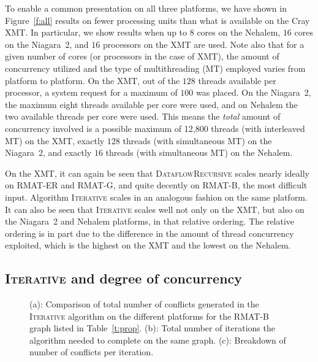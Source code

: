 \documentclass{article}
\begin{document}
To enable a common presentation on all three platforms,  we have shown 
in Figure~\ref{f:all} results on fewer processing units than what is available
on the Cray XMT. In particular, we show results when up to $8$ cores on the Nehalem, 
$16$ cores on the Niagara~2, and $16$ processors on the XMT are used.   
Note also that for a given number of cores (or processors in the case of XMT),
the amount of concurrency utilized and the type of 
multithreading (MT) employed varies from platform to platform. 
On the XMT, out of  the $128$ threads 
available per processor,  a system request for a maximum of $100$ was placed.
On the Niagara~2, the maximum eight threads available per core were used,
and on Nehalem the two available threads per core were used.   
This means the {\em total} amount of concurrency involved is a possible maximum of 
12,800 threads (with interleaved MT) on the XMT, 
exactly $128$ threads (with simultaneous MT) on the Niagara~2, and 
exactly $16$ threads  (with simultaneous MT) on the Nehalem.


On the XMT, it can again be seen that \textsc{DataflowRecursive} scales 
nearly ideally on RMAT-ER and RMAT-G, and quite decently on RMAT-B, the most difficult input. 
Algorithm \textsc{Iterative} scales in an analogous fashion on the same platform.
It can also be seen that \textsc{Iterative} scales well not only on the XMT, but
also on the Niagara~2 and Nehalem platforms, in that relative ordering.
The relative ordering is in part due  to the difference in the amount of thread concurrency
exploited, which is the highest on the XMT and the lowest on the Nehalem.

\subsection{\textsc{Iterative} and degree of concurrency}
\label{sec:iterative-more}

\begin{figure}
\centering
{}
\caption{\small 
(a): Comparison of total number of conflicts generated in the \textsc{Iterative} algorithm
on the different platforms for the RMAT-B graph listed in Table~\ref{t:prop}.
(b): Total number of iterations the algorithm needed to complete on the same graph.
(c): Breakdown of number of conflicts per iteration.}
\label{f:conflicts-iterations}
\end{figure}
\end{document}
